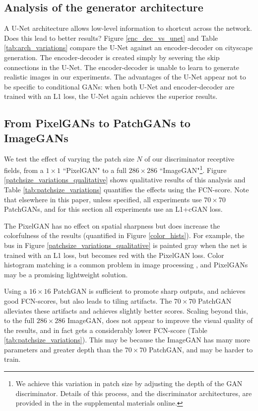 \documentclass[10pt,twocolumn,letterpaper]{article}
\begin{document}
\subsection{Analysis of the generator architecture}\label{analysis_of_gen_arch}

A U-Net architecture allows low-level information to shortcut across the network. Does this lead to better results? Figure \ref{enc_dec_vs_unet} and Table \ref{tab:arch_variations} compare the U-Net against an encoder-decoder on cityscape generation. The encoder-decoder is created simply by severing the skip connections in the U-Net. The encoder-decoder is unable to learn to generate realistic images in our experiments. The advantages of the U-Net appear not to be specific to conditional GANs: when both U-Net and encoder-decoder are trained with an L1 loss, the U-Net again achieves the superior results.



\subsection{From PixelGANs to PatchGANs to ImageGANs}\label{patch_variations_section}

We test the effect of varying the patch size $N$ of our discriminator receptive fields, from a $1\times1$ ``PixelGAN" to a full $286\times286$ ``ImageGAN"\footnote{We achieve this variation in patch size by adjusting the depth of the GAN discriminator. Details of this process, and the discriminator architectures, are provided in the in the supplemental materials online.}. Figure \ref{patchsize_variations_qualitative} shows qualitative results of this analysis and Table \ref{tab:patchsize_variations} quantifies the effects using the FCN-score. Note that elsewhere in this paper, unless specified, all experiments use $70\times70$ PatchGANs, and for this section all experiments use an L1+cGAN loss.

The PixelGAN has no effect on spatial sharpness but does increase the colorfulness of the results (quantified in Figure \ref{color_hists}). For example, the bus in Figure \ref{patchsize_variations_qualitative} is painted gray when the net is trained with an L1 loss, but becomes red with the PixelGAN loss. Color histogram matching is a common problem in image processing \cite{reinhard_color_2001}, and PixelGANs may be a promising lightweight solution.

Using a $16\times16$ PatchGAN is sufficient to promote sharp outputs, and achieves good FCN-scores, but also leads to tiling artifacts. The $70\times70$ PatchGAN alleviates these artifacts and achieves slightly better scores. Scaling beyond this, to the full $286\times286$ ImageGAN, does not appear to improve the visual quality of the results, and in fact gets a considerably lower FCN-score (Table \ref{tab:patchsize_variations}). This may be because the ImageGAN has many more parameters and greater depth than the $70\times70$ PatchGAN, and may be harder to train.
\end{document}
